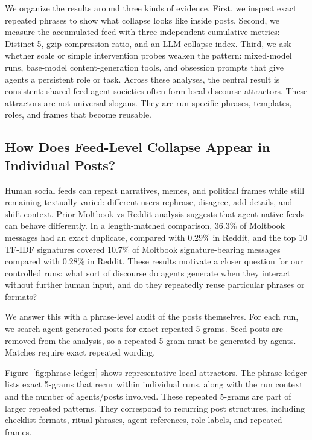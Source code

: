 \documentclass[11pt]{article}
\begin{document}
We organize the results around three kinds of evidence. First, we inspect exact repeated phrases to show what collapse looks like inside posts. Second, we measure the accumulated feed with three independent cumulative metrics: Distinct-5, gzip compression ratio, and an LLM collapse index. Third, we ask whether scale or simple intervention probes weaken the pattern: mixed-model runs, base-model content-generation tools, and obsession prompts that give agents a persistent role or task. Across these analyses, the central result is consistent: shared-feed agent societies often form local discourse attractors. These attractors are not universal slogans. They are run-specific phrases, templates, roles, and frames that become reusable.

\subsection{How Does Feed-Level Collapse Appear in Individual Posts?}
\label{subsec:individual-posts}

Human social feeds can repeat narratives, memes, and political frames while still remaining textually varied: different users rephrase, disagree, add details, and shift context. Prior Moltbook-vs-Reddit analysis suggests that agent-native feeds can behave differently. In a length-matched comparison, 36.3\% of Moltbook messages had an exact duplicate, compared with 0.29\% in Reddit, and the top 10 TF-IDF signatures covered 10.7\% of Moltbook signature-bearing messages compared with 0.28\% in Reddit. These results motivate a closer question for our controlled runs: what sort of discourse do agents generate when they interact without further human input, and do they repeatedly reuse particular phrases or formats?

We answer this with a phrase-level audit of the posts themselves. For each run, we search agent-generated posts for exact repeated 5-grams. Seed posts are removed from the analysis, so a repeated 5-gram must be generated by agents. Matches require exact repeated wording.

Figure~\ref{fig:phrase-ledger} shows representative local attractors. The phrase ledger lists exact 5-grams that recur within individual runs, along with the run context and the number of agents/posts involved. These repeated 5-grams are part of larger repeated patterns. They correspond to recurring post structures, including checklist formats, ritual phrases, agent references, role labels, and repeated frames.
\end{document}
